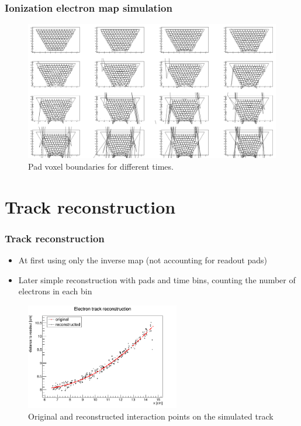 \documentclass{beamer}
\begin{document}
	\begin{frame}
		\frametitle{Ionization electron map simulation}
		\begin{figure}
			\centering
			\includegraphics[height=0.68\textheight]{../images/pads_dist.png}
			{Pad voxel boundaries for different times.}
		\end{figure}
	\end{frame}


	\section{Track reconstruction}
	\begin{frame}
		\frametitle{Track reconstruction}
		\begin{itemize}
			\item At first using only the inverse map (not accounting for readout pads)
			\item Later simple reconstruction with pads and time bins, counting the number of electrons in each bin
		\end{itemize}
		\begin{figure}
			\centering
			\includegraphics[width=0.6\textwidth]{../images/reco_track.png}\\
			\small{Original and reconstructed interaction points on the simulated track}
		\end{figure}
	\end{frame}
\end{document}
